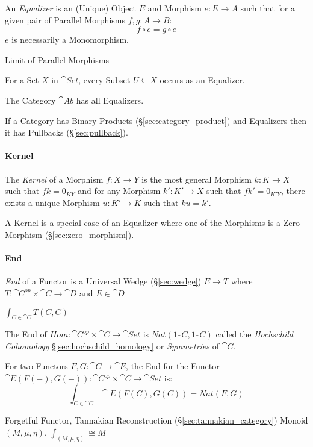 An \emph{Equalizer} is an (Unique) Object $E$ and Morphism $e: E
\rightarrow A$ such that for a given pair of Parallel Morphisms $f,g :
A \rightarrow B$:
\[
  f \circ e = g \circ e
\]
$e$ is necessarily a Monomorphism.

Limit of Parallel Morphisms

For a Set $X$ in $\cat{Set}$, every Subset $U \subseteq X$ occurs
as an Equalizer.

The Category $\cat{Ab}$ has all Equalizers.

If a Category has Binary Products (\S\ref{sec:category_product}) and
Equalizers then it has Pullbacks (\S\ref{sec:pullback}).



\paragraph{Kernel}\label{sec:morphism_kernel}\hfill

The \emph{Kernel} of a Morphism $f : X \rightarrow Y$ is the most
general Morphism $k : K \rightarrow X$ such that $fk = 0_{KY}$ and for
any Morphism $k' : K' \rightarrow X$ such that $fk' = 0_{K'Y}$, there
exists a unique Morphism $u : K' \rightarrow K$ such that $ku = k'$.

A Kernel is a special case of an Equalizer where one of the Morphisms
is a Zero Morphism (\S\ref{sec:zero_morphism}).



\paragraph{End}\label{sec:end}\hfill

\emph{End} of a Functor is a Universal Wedge (\S\ref{sec:wedge}) $E
\xrightarrow{.} T$ where $T : \cat{C}^{op} \times \cat{C}
\rightarrow \cat{D}$ and $E \in \cat{D}$

$\int_{C \in \cat{C}} T(C,C)$

The End of $Hom : \cat{C}^{op} \times \cat{C} \rightarrow
\cat{Set}$ is $Nat (1_\cat{C},1_\cat{C})$ called the
\emph{Hochschild Cohomology} \S\ref{sec:hochschild_homology} or
\emph{Symmetries} of $\cat{C}$.

For two Functors $F,G : \cat{C} \rightarrow \cat{E}$, the End for
the Functor $\cat{E}(F(-), G(-)) : \cat{C}^{op} \times
\cat{C} \rightarrow \cat{Set}$ is:
\[
  \int_{C \in \cat{C}} \cat{E}(F(C), G(C)) = Nat (F,G)
\]

Forgetful Functor, Tannakian Reconstruction
(\S\ref{sec:tannakian_category}) %
Monoid $(M,\mu,\eta)$, $\int_{(M,\mu,\eta)} \cong M$



